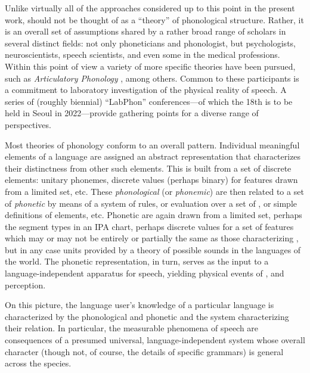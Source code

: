 Unlike virtually all of the approaches considered up to this point in
the present work,  should not be thought of as a
``theory'' of phonological structure. Rather, it is an overall set of
assumptions shared by a rather broad range of scholars in several
distinct fields: not only phoneticians and phonologist, but
psychologists, neuroscientists, speech scientists, and even some in
the medical professions. Within this point of view a variety of more
specific theories have been pursued, such as \emph{Articulatory Phonology}
\citep{browman-goldstein89:articulatory-phonology}, among
others. Common to these participants is a commitment to laboratory
investigation of the physical reality of speech. A series of (roughly
biennial) ``LabPhon'' conferences---of which the 18th is to be held in
Seoul in 2022---provide gathering points for a diverse range of
perspectives.

Most theories of phonology conform to an overall pattern. Individual
meaningful elements of a language are assigned an abstract
representation that characterizes their distinctness from other such
elements. This is built from a set of discrete elements: unitary
phonemes, discrete values (perhaps binary) for features drawn from a
limited set, etc. These \emph{phonological} (or \emph{phonemic})
 are then related to a set of \emph{phonetic} 
by means of a system of rules, or evaluation over a set of
, or simple definitions of elements, etc. Phonetic
 are again drawn from a limited set, perhaps the
segment types in an IPA chart, perhaps discrete values for a set of
features which may or may not be entirely or partially the same as
those characterizing , but in any case
units provided by a theory of possible sounds in the languages of the
world. The phonetic representation, in turn, serves as the input to a
language-independent apparatus for speech, yielding physical events of
,  and perception.

On this picture, the language user's knowledge of a particular
language is characterized by the phonological and phonetic
 and the system characterizing their relation. In
particular, the measurable phenomena of speech are consequences of a
presumed universal, language-independent system whose overall
character (though not, of course, the details of specific grammars) is
general across the species.

